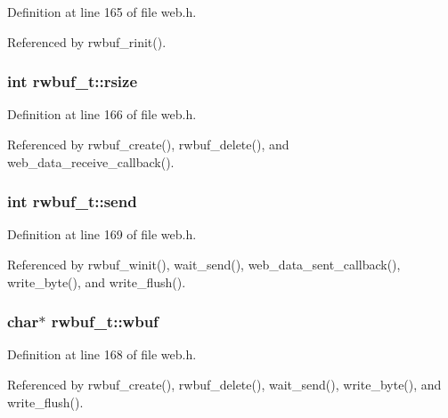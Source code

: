 Definition at line 165 of file web.\+h.



Referenced by rwbuf\+\_\+rinit().

\subsubsection[{\texorpdfstring{rsize}{rsize}}]{\setlength{\rightskip}{0pt plus 5cm}int rwbuf\+\_\+t\+::rsize}\hypertarget{structrwbuf__t_aa4094c7e329ae85cc50dbd06d3b50d44}{}\label{structrwbuf__t_aa4094c7e329ae85cc50dbd06d3b50d44}


Definition at line 166 of file web.\+h.



Referenced by rwbuf\+\_\+create(), rwbuf\+\_\+delete(), and web\+\_\+data\+\_\+receive\+\_\+callback().

\subsubsection[{\texorpdfstring{send}{send}}]{\setlength{\rightskip}{0pt plus 5cm}int rwbuf\+\_\+t\+::send}\hypertarget{structrwbuf__t_a279490994b6576ad00900254a8c07a89}{}\label{structrwbuf__t_a279490994b6576ad00900254a8c07a89}


Definition at line 169 of file web.\+h.



Referenced by rwbuf\+\_\+winit(), wait\+\_\+send(), web\+\_\+data\+\_\+sent\+\_\+callback(), write\+\_\+byte(), and write\+\_\+flush().

\subsubsection[{\texorpdfstring{wbuf}{wbuf}}]{\setlength{\rightskip}{0pt plus 5cm}char$\ast$ rwbuf\+\_\+t\+::wbuf}\hypertarget{structrwbuf__t_a68386231f3d907ec4508c090925782a2}{}\label{structrwbuf__t_a68386231f3d907ec4508c090925782a2}


Definition at line 168 of file web.\+h.



Referenced by rwbuf\+\_\+create(), rwbuf\+\_\+delete(), wait\+\_\+send(), write\+\_\+byte(), and write\+\_\+flush().


